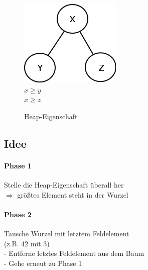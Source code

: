\begin{figure}[h]
\begin{center}
\includegraphics[width=0.2\linewidth]{01/Grafik/HeapEigenschaft.png}\\
$x \geq y$\\
$x \geq z$
\caption{Heap-Eigenschaft}
\end{center}
\end{figure}


\subsection{Idee}
\paragraph{Phase 1} Stelle die Heap-Eigenschaft überall her\\
$\Rightarrow$ größtes Element steht in der Wurzel
\paragraph{Phase 2} Tausche Wurzel mit letztem Feldelement\\
(z.B. 42 mit 3)\\
- Entferne letztes Feldelement aus dem Baum\\
- Gehe erneut zu Phase 1
